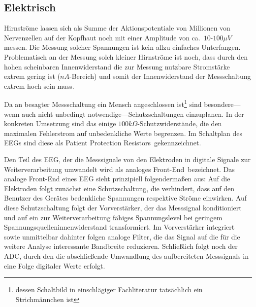 \documentclass[12pt,a4paper,notitlepage]{article}
\begin{document}
\subsection{Elektrisch}
Hirnströme lassen sich als Summe der Aktionspotentiale von Millionen von Nervenzellen auf der Kopfhaut noch mit einer Amplitude von ca.\ $10$-$100\mu V$ messen\cite{MAYER1}. Die Messung solcher Spannungen ist kein allzu einfaches Unterfangen. Problematisch an der Messung solch kleiner Hirnströme ist noch, dass durch den hohen scheinbaren Innenwiderstand die zur Messung nutzbare Stromstärke extrem gering ist ($nA$-Bereich) und somit der Innenwiderstand der Messschaltung extrem hoch sein muss.

Da an besagter Messschaltung ein Mensch angeschlossen ist\footnote{dessen Schaltbild in einschlägiger Fachliteratur tatsächlich ein Strichmännchen ist} sind besondere---wenn auch nicht unbedingt notwendige---Schutzschaltungen einzuplanen. In der konkreten Umsetzung sind das einige $100k\Omega$-Schutzwiderstände, die den maximalen \gls{Fehlerstrom} auf unbedenkliche Werte begrenzen. Im Schaltplan des EEGs sind diese als \glqq Patient Protection Resistors\grqq\ gekennzeichnet.

Den Teil des \gls{EEG}, der die Messsignale von den Elektroden in digitale Signale zur Weiterverarbeitung umwandelt wird als \glqq analoges Front-End\grqq\ bezeichnet. Das analoge Front-End eines \gls{EEG} sieht prinzipiell folgendermaßen aus: Auf die Elektroden folgt zunächst eine Schutzschaltung, die verhindert, dass auf den Benutzer des Gerätes bedenkliche Spannungen respektive Ströme einwirken. Auf diese Schutzschaltung folgt der Vorverstärker, der das Messsignal konditioniert und auf ein zur Weiterverarbeitung fähiges Spannungslevel bei geringem Spannungsquelleninnenwiderstand transformiert. Im Vorverstärker integriert sowie unmittelbar dahinter folgen analoge Filter, die das Signal auf die für die weitere Analyse interessante Bandbreite reduzieren. Schließlich folgt noch der \gls{ADC}, durch den die abschließende Umwandlung des aufbereiteten Messsignals in eine Folge digitaler Werte erfolgt.\cite{LINEAR3,MAXIM3,MAXIM9,MAXIM21,MAXIM59,TEXAS12,LINEAR1,LINEAR2,LINEAR4,LINEAR5}
\end{document}
